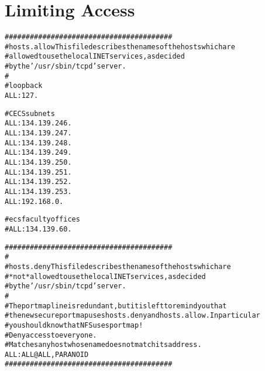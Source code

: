 \chapter{Limiting Access} \label{ap:restrict}

\begin{alltt}
\normalfont
\singlespacing
########################################
# hosts.allow	This file describes the names of the hosts which are
#		allowed to use the local INET services, as decided
#		by the '/usr/sbin/tcpd' server.
#
# loop back
ALL:127.

# CECS subnets
ALL:134.139.246.
ALL:134.139.247.
ALL:134.139.248.
ALL:134.139.249.
ALL:134.139.250.
ALL:134.139.251.
ALL:134.139.252.
ALL:134.139.253.
ALL:192.168.0.

# ecs faculty offices
#ALL:134.139.60.

########################################
#
# hosts.deny	This file describes the names of the hosts which are
#		*not* allowed to use the local INET services, as decided
#		by the '/usr/sbin/tcpd' server.
#
# The portmap line is redundant, but it is left to remind you that
# the new secure portmap uses hosts.deny and hosts.allow.  In particular
# you should know that NFS uses portmap!
# Deny access to everyone.
# Matches any host whose name does not match its address.
ALL: ALL@ALL, PARANOID 
########################################
\end{alltt}


